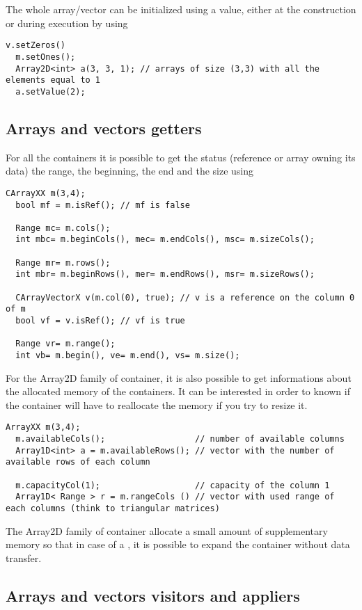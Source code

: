 \documentclass[a4paper,10pt]{article}
\begin{document}
The whole array/vector can be initialized using a value, either at the construction
or during execution by using
\begin{lstlisting}[style=customcpp]
  v.setZeros()
  m.setOnes();
  Array2D<int> a(3, 3, 1); // arrays of size (3,3) with all the elements equal to 1
  a.setValue(2);
\end{lstlisting}

\subsection{Arrays and vectors getters}

For all the containers it is possible to get the status (reference or array owning its data)
the  range, the beginning, the end and the size using
\begin{lstlisting}[style=customcpp]
  CArrayXX m(3,4);
  bool mf = m.isRef(); // mf is false

  Range mc= m.cols();
  int mbc= m.beginCols(), mec= m.endCols(), msc= m.sizeCols();

  Range mr= m.rows();
  int mbr= m.beginRows(), mer= m.endRows(), msr= m.sizeRows();

  CArrayVectorX v(m.col(0), true); // v is a reference on the column 0 of m
  bool vf = v.isRef(); // vf is true

  Range vr= m.range();
  int vb= m.begin(), ve= m.end(), vs= m.size();
\end{lstlisting}

For the Array2D family of container, it is also possible to get informations about the
allocated memory of the containers. It can be interested in order to known
if the container will have to reallocate the memory if you try to resize it.
\begin{lstlisting}[style=customcpp]
  ArrayXX m(3,4);
  m.availableCols();                  // number of available columns
  Array1D<int> a = m.availableRows(); // vector with the number of available rows of each column

  m.capacityCol(1);                   // capacity of the column 1
  Array1D< Range > r = m.rangeCols () // vector with used range of each columns (think to triangular matrices)
\end{lstlisting}
The Array2D family of container allocate a small amount of supplementary memory
so that in case of a , it is possible to expand the container without
data transfer.

\subsection{Arrays and vectors visitors and appliers}
\end{document}
